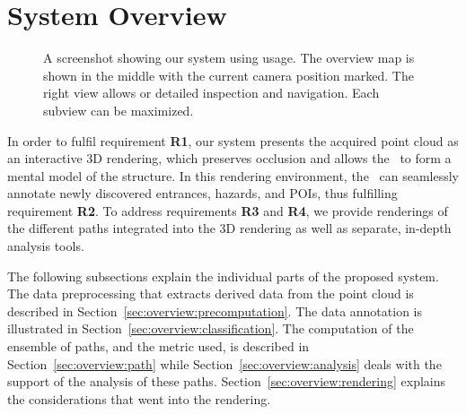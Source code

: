\section{System Overview} \label{sec:overview}
\begin{figure}
    \centering
    \caption{A screenshot showing our system using usage. The overview map is shown in the middle with the current camera position marked. The right view allows or detailed inspection and navigation. Each subview can be maximized.}
    \label{sec:overview:system}
\end{figure}

In order to fulfil requirement {\bfseries R1}, our system presents the acquired point cloud as an interactive 3D rendering, which preserves occlusion and allows the \IC\ to form a mental model of the structure. In this rendering environment, the \IC\ can seamlessly annotate newly discovered entrances, hazards, and POIs, thus fulfilling requirement {\bfseries R2}. To address requirements {\bfseries R3} and {\bfseries R4}, we provide renderings of the different paths integrated into the 3D rendering as well as separate, in-depth analysis tools.

The following subsections explain the individual parts of the proposed system. The data preprocessing that extracts derived data from the point cloud is described in Section~\ref{sec:overview:precomputation}. The data annotation is illustrated in Section~\ref{sec:overview:classification}. The computation of the ensemble of paths, and the metric used, is described in Section~\ref{sec:overview:path} while Section~\ref{sec:overview:analysis} deals with the support of the analysis of these paths. Section~\ref{sec:overview:rendering} explains the considerations that went into the rendering.

